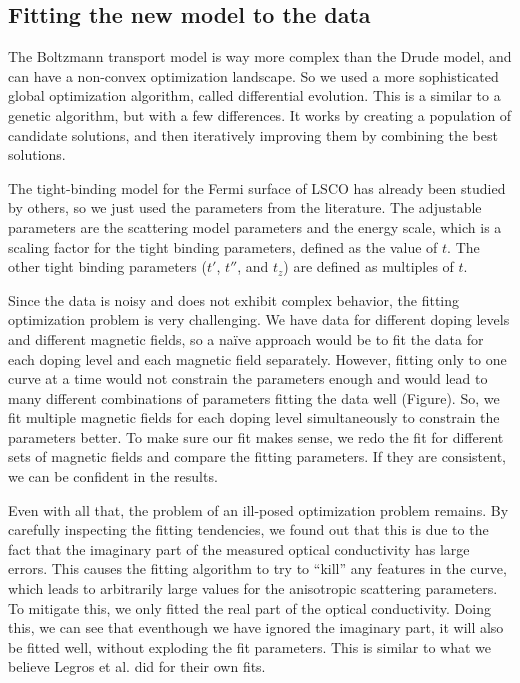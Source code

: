 \subsection{Fitting the new model to the data}
The Boltzmann transport model is way more complex than the Drude model, and can have a non-convex
optimization landscape. So we used a more sophisticated global optimization algorithm, called
differential evolution. This is a similar to a genetic algorithm, but with a few differences. It
works by creating a population of candidate solutions, and then iteratively improving them by
combining the best solutions.

The tight-binding model for the Fermi surface of LSCO has already been studied by others, so we
just used the parameters from the literature. The adjustable parameters are the scattering model
parameters and the energy scale, which is a scaling factor for the tight binding parameters,
defined as the value of $t$. The other tight binding parameters ($t'$, $t''$, and $t_z$) are
defined as multiples of $t$.

Since the data is noisy and does not exhibit complex behavior, the fitting optimization problem is
very challenging. We have data for different doping levels and different magnetic fields, so a
naïve approach would be to fit the data for each doping level and each magnetic field separately.
However, fitting only to one curve at a time would not constrain the parameters enough and would
lead to many different combinations of parameters fitting the data well (Figure). So, we fit multiple
magnetic fields for each doping level simultaneously to constrain the parameters better. To make
sure our fit makes sense, we redo the fit for different sets of magnetic fields and compare the
fitting parameters. If they are consistent, we can be confident in the results.

Even with all that, the problem of an ill-posed optimization problem remains. By carefully
inspecting the fitting tendencies, we found out that this is due to the fact that the imaginary
part of the measured optical conductivity has large errors. This causes the fitting algorithm to
try to ``kill'' any features in the curve, which leads to arbitrarily large values for the
anisotropic scattering parameters. To mitigate this, we only fitted the real part of the optical
conductivity. Doing this, we can see that eventhough we have ignored the imaginary part, it will
also be fitted well, without exploding the fit parameters. This is similar to what we believe
Legros et al. did for their own fits.

